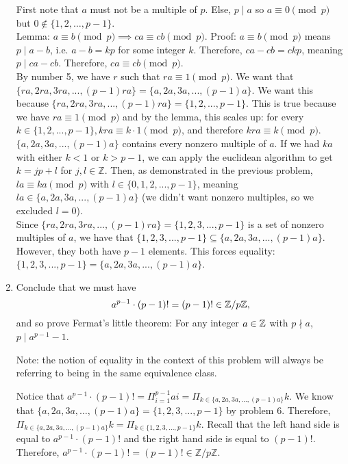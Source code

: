 \documentclass{amsart}
\begin{document}
\begin{enumerate}[itemsep=0.4in]
First note that $a$ must not be a multiple of $p$. Else, $p\mid a$ so $a\equiv 0\pmod p$ but $0\notin\{1,2,\ldots,p-1\}$.\\

Lemma: $a\equiv b\pmod p\implies ca\equiv cb\pmod p$. Proof: $a\equiv b\pmod p$ means $p\mid a-b$, i.e. $a-b=kp$ for some integer $k$. Therefore, $ca-cb=ckp$, meaning $p\mid ca-cb$. Therefore, $ca\equiv cb\pmod p$. \\

By number 5, we have $r$ such that $ra\equiv 1\pmod p$. We want that $\{ra,2ra,3ra,...,(p-1)ra\}=\{a,2a,3a,...,(p-1)a\}$. We want this because $\{ra,2ra,3ra,...,(p-1)ra\}=\{1,2,...,p-1\}$. This is true because we have $ra\equiv1\pmod p$ and by the lemma, this scales up: for every $k\in\{1,2,...,p-1\},kra\equiv k\cdot 1\pmod p$, and therefore $kra\equiv k\pmod p$. \\

$\{a,2a,3a,...,(p-1)a\}$ contains every nonzero multiple of $a$. If we had $ka$ with either $k<1$ or $k>p-1$, we can apply the euclidean algorithm to get $k=jp+l$ for $j,l\in\mathbb Z$. Then, as demonstrated in the previous problem, $la\equiv ka\pmod p$ with $l\in\{0,1,2,...,p-1\}$, meaning $la\in\{a,2a,3a,...,(p-1)a\}$ (we didn't want nonzero multiples, so we excluded $l=0$).\\

Since $\{ra,2ra,3ra,...,(p-1)ra\}=\{1,2,3,...,p-1\}$ is a set of nonzero multiples of $a$, we have that $\{1,2,3,...,p-1\}\subseteq\{a,2a,3a,...,(p-1)a\}$. However, they both have $p-1$ elements. This forces equality: $\{1,2,3,...,p-1\}=\{a,2a,3a,...,(p-1)a\}$.


\item Conclude that we must have
\[
a^{p-1}\cdot (p-1)! = (p-1)! \in \mathbb{Z}/p\mathbb{Z},
\]
and so prove Fermat's little theorem: For any integer $a\in\mathbb{Z}$ with $p\nmid a$, $p\mid a^{p-1} - 1$.

Note: the notion of equality in the context of this problem will always be referring to being in the same equivalence class.

Notice that $a^{p-1}\cdot(p-1)!=\Pi_{i=1}^{p-1}ai=\Pi_{k\in\{a,2a,3a,\ldots,(p-1)a\}}k$. We know that $\{a,2a,3a,\ldots,(p-1)a\}=\{1,2,3,...,p-1\}$ by problem 6. Therefore, $\Pi_{k\in\{a,2a,3a,\ldots,(p-1)a\}}k=\Pi_{k\in\{1,2,3,...,p-1\}}k$. Recall that the left hand side is equal to $a^{p-1}\cdot(p-1)!$ and the right hand side is equal to $(p-1)!$. Therefore, $a^{p-1}\cdot(p-1)!=(p-1)!\in\mathbb{Z}/p\mathbb{Z}$.


\end{enumerate}
\end{document}
